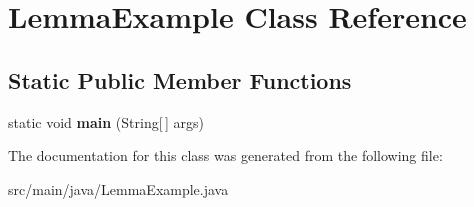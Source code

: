 \hypertarget{classLemmaExample}{}\section{Lemma\+Example Class Reference}
\label{classLemmaExample}
\subsection*{Static Public Member Functions}
\begin{DoxyCompactItemize}
\item 
\mbox{\label{classLemmaExample_aaacdfba7222f35a580de77e1dd70dffa}} 
static void {\bfseries main} (String\mbox{[}$\,$\mbox{]} args)
\end{DoxyCompactItemize}


The documentation for this class was generated from the following file\+:\begin{DoxyCompactItemize}
\item 
src/main/java/Lemma\+Example.\+java\end{DoxyCompactItemize}
